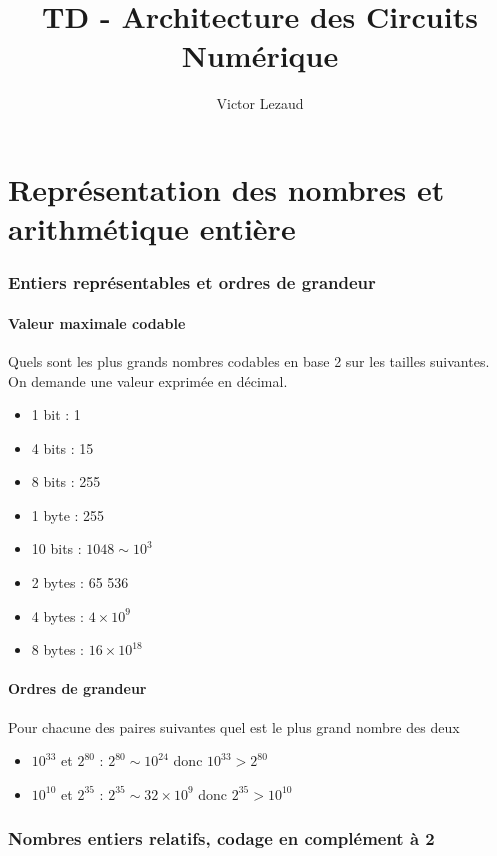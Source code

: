 \documentclass[10pt,a4paper]{article}
\author{Victor Lezaud}
\title{TD - Architecture des Circuits Numérique}
\begin{document}
\renewcommand{\partname}{Séance de Travaux Dirigés}

\maketitle
\renewcommand{\contentsname}{Sommaire}
\setcounter{tocdepth}{2}
\tableofcontents

\newpage

\part{Représentation des nombres et arithmétique entière}

\section{Entiers représentables et ordres de grandeur}
\subsection{Valeur maximale codable}
Quels sont les plus grands nombres codables en base 2 sur les tailles suivantes. On demande une valeur exprimée en décimal.
\begin{itemize}
\item 1 bit : 1
\item 4 bits : 15
\item 8 bits : 255
\item 1 byte : 255
\item 10 bits : $1048\sim 10^{3}$
\item 2 bytes : 65 536
\item 4 bytes : $4 \times 10^{9}$
\item 8 bytes : $16\times 10^{18}$
\end{itemize}

\subsection{Ordres de grandeur}
Pour chacune des paires suivantes quel est le plus grand nombre des deux
\begin{itemize}
\item $10^{33}$ et $2^{80}$ : $2^{80} \sim 10^{24}$ donc $10^{33} > 2^{80}$
\item $10^{10}$ et $2^{35}$ : $2^{35} \sim 32\times 10^{9}$ donc $2^{35} > 10^{10}$
\end{itemize}

\section{Nombres entiers relatifs, codage en complément à 2}
\end{document}
